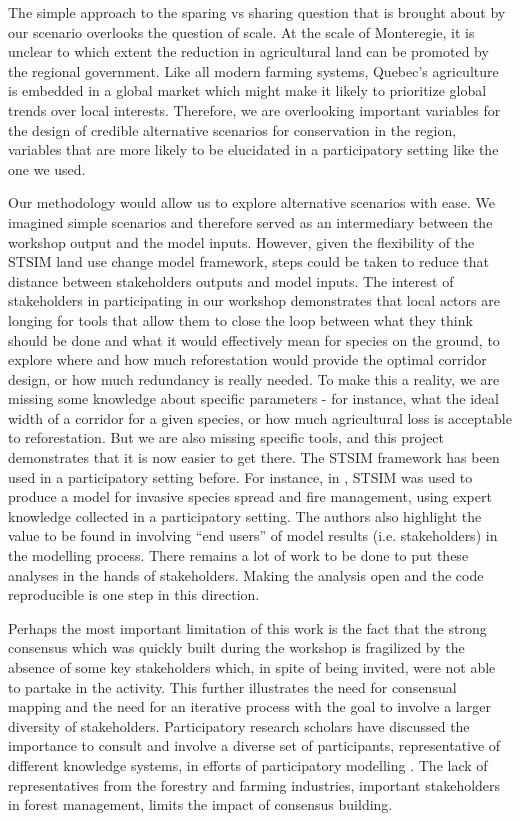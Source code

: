 {The simple approach to the sparing vs sharing question that is brought about by our scenario overlooks the question of scale. At the scale of Monteregie, it is unclear to which extent the reduction in agricultural land can be promoted by the regional government. Like all modern farming systems, Quebec's agriculture is embedded in a global market which might make it likely to prioritize global trends over local interests. Therefore, we are overlooking important variables for the design of credible alternative scenarios for conservation in the region, variables that are more likely to be elucidated in a participatory setting like the one we used.

Our methodology would allow us to explore alternative scenarios with ease. We imagined simple scenarios and therefore served as an intermediary between the workshop output and the model inputs. However, given the flexibility of the STSIM land use change model framework, steps could be taken to reduce that distance between stakeholders outputs and model inputs. The interest of stakeholders in participating in our workshop demonstrates that local actors are longing for tools that allow them to close the loop between what they think should be done and what it would effectively mean for species on the ground, to explore where and how much reforestation would provide the optimal corridor design, or how much redundancy is really needed. To make this a reality, we are missing some knowledge about specific parameters - for instance, what the ideal width of a corridor for a given species, or how much agricultural loss is acceptable to reforestation. But we are also missing specific tools, and this project demonstrates that it is now easier to get there. The STSIM framework has been used in a participatory setting before. For instance, in \cite{jarnevich_developing_2019}, STSIM was used to produce a model for invasive species spread and fire management, using expert knowledge collected in a participatory setting. The authors also highlight the value to be found in involving “end users” of model results (i.e. stakeholders) in the modelling process. There remains a lot of work to be done to put these analyses in the hands of stakeholders. Making the analysis open and the code reproducible is one step in this direction.

Perhaps the most important limitation of this work is the fact that the strong consensus which was quickly built during the workshop is fragilized by the absence of some key stakeholders which, in spite of being invited, were not able to partake in the activity. This further illustrates the need for consensual mapping and the need for an iterative process with the goal to involve a larger diversity of stakeholders. Participatory research scholars have discussed the importance to consult and involve a diverse set of participants, representative of different knowledge systems, in efforts of participatory modelling \cite{gray_modeling_2012}. The lack of representatives from the forestry and farming industries, important stakeholders in forest management, limits the impact of consensus building. 

}
